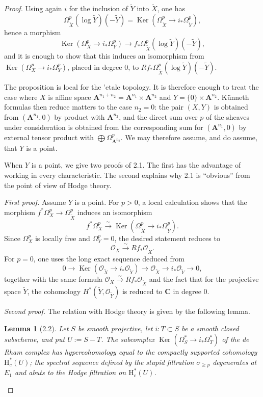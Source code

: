 \documentclass[11pt]{amsart}
\newtheorem{lemma}[theorem]{Lemma}
\theoremstyle{definition}
\DeclareMathOperator{\Ker}{Ker}
\begin{document}
\begin{proof}
Using again $i$ for the inclusion of $\widetilde Y$ into $\widetilde X$, one has
\[
\Omega_{\widetilde X}^p(\log \widetilde Y)(-\widetilde Y)=\Ker(\Omega_{\widetilde X}^p\to i_*\Omega_{\widetilde Y}^p),
\]
hence a morphism
\[
\Ker(\Omega_X^p\to i_*\Omega_Y^p) \to f_*\Omega_{\widetilde X}^p(\log \widetilde Y)(-\widetilde Y),
\]
and it is enough to show that this induces an isomorphism from $\Ker(\Omega_X^p\to i_*\Omega_Y^p)$, placed in degree $0$, to $Rf_*\Omega_{\widetilde X}^p(\log \widetilde Y)(-\widetilde Y)$.

The proposition is local for the 'etale topology. It is therefore enough to treat the case where $X$ is affine space $\mathbf A^{n_1+n_2}=\mathbf A^{n_1}\times \mathbf A^{n_2}$ and $Y=\{0\}\times \mathbf A^{n_2}$. K\"unneth formulas then reduce matters to the case $n_2=0$: the pair $(X,Y)$ is obtained from $(\mathbf A^{n_1},0)$ by product with $\mathbf A^{n_2}$, and the direct sum over $p$ of the sheaves under consideration is obtained from the corresponding sum for $(\mathbf A^{n_1},0)$ by external tensor product with $\bigoplus \Omega_{\mathbf A^{n_2}}^p$. We may therefore assume, and do assume, that $Y$ is a point.

When $Y$ is a point, we give two proofs of 2.1. The first has the advantage of working in every characteristic. The second explains why 2.1 is ``obvious'' from the point of view of Hodge theory.

\smallskip
\emph{First proof.} Assume $Y$ is a point. For $p>0$, a local calculation shows that the morphism $f^*\Omega_X^p\to \Omega_{\widetilde X}^p$ induces an isomorphism
\[
f^*\Omega_X^p \xrightarrow{\sim} \Ker(\Omega_{\widetilde X}^p\to i_*\Omega_{\widetilde Y}^p).
\]
Since $\Omega_X^p$ is locally free and $\Omega_Y^p=0$, the desired statement reduces to
\[
\mathscr O_X \xrightarrow{\sim} Rf_*\mathscr O_{\widetilde X}.
\]
For $p=0$, one uses the long exact sequence deduced from
\[
0\to \Ker(\mathscr O_{\widetilde X}\to i_*\mathscr O_{\widetilde Y}) \to \mathscr O_{\widetilde X} \to i_*\mathscr O_{\widetilde Y}\to 0,
\]
together with the same formula $\mathscr O_X\xrightarrow{\sim} Rf_*\mathscr O_{\widetilde X}$ and the fact that for the projective space $\widetilde Y$, the cohomology $H^*(\widetilde Y,\mathscr O_{\widetilde Y})$ is reduced to $\mathbf C$ in degree $0$.

\smallskip
\emph{Second proof.} The relation with Hodge theory is given by the following lemma.

\begin{lemma}[2.2]
Let $S$ be smooth projective, let $i:T\subset S$ be a smooth closed subscheme, and put $U:=S-T$. The subcomplex $\Ker(\Omega_S^*\to i_*\Omega_T^*)$ of the de Rham complex has hypercohomology equal to the compactly supported cohomology $\mathrm H_c^*(U)$; the spectral sequence defined by the stupid filtration $\sigma_{\ge p}$ degenerates at $E_1$ and abuts to the Hodge filtration on $\mathrm H_c^*(U)$.
\end{lemma}


\end{proof}
\end{document}
